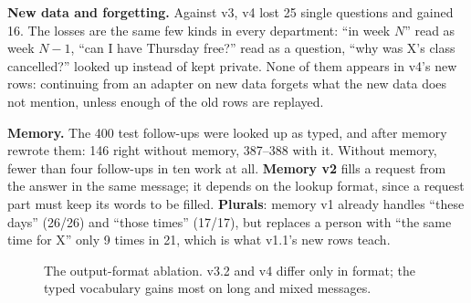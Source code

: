 \documentclass[11pt,a4paper]{article}
\begin{document}
\textbf{New data and forgetting.} Against v3, v4 lost 25 single questions and gained 16. The losses are the same few
kinds in every department: ``in week $N$'' read as week $N-1$, ``can I have Thursday free?'' read as a question, ``why
was X's class cancelled?'' looked up instead of kept private. None of them appears in v4's new rows: continuing from
an adapter on new data forgets what the new data does not mention, unless enough of the old rows are replayed.

\textbf{Memory.} The 400 test follow-ups were looked up as typed, and after memory rewrote them: 146 right without
memory, 387--388 with it. Without memory, fewer than four follow-ups in ten work at all. \textbf{Memory v2} fills a
request from the answer in the same message; it depends on the lookup format, since a request part must keep its
words to be filled. \textbf{Plurals}: memory v1 already handles ``these days'' (26/26) and ``those times'' (17/17),
but replaces a person with ``the same time for X'' only 9 times in 21, which is what v1.1's new rows teach.

\begin{figure}[!htb]
\centering
{}
\caption{The output-format ablation. v3.2 and v4 differ only in format; the typed vocabulary gains most on long and
mixed messages.}
\label{fig:abl-format}
\end{figure}
\end{document}
